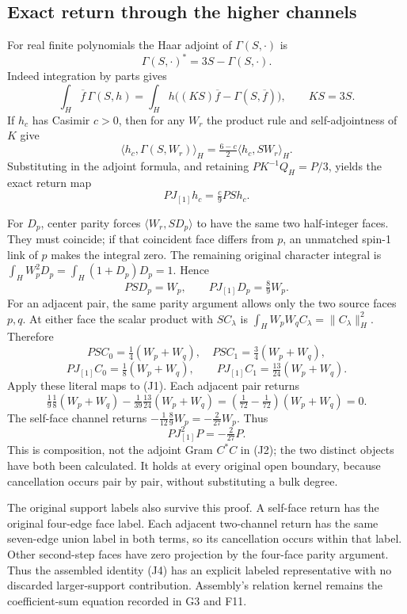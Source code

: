 \documentclass[11pt]{article}
\begin{document}
\subsection*{Exact return through the higher channels}

For real finite polynomials the Haar adjoint of \(\Gamma(S,\cdot)\) is
\[
 \Gamma(S,\cdot)^*=3S-\Gamma(S,\cdot).
\]
Indeed integration by parts gives
\[
 \int_H\overline f\,\Gamma(S,h)
 =\int_Hh\big((KS)\overline f-\Gamma(S,\overline f)\big),
 \qquad KS=3S.
\]
If \(h_c\) has Casimir \(c>0\), then for any \(W_r\) the product rule and self-adjointness of \(K\) give
\[
 \langle h_c,\Gamma(S,W_r)\rangle_H
 =\tfrac{6-c}2\langle h_c,SW_r\rangle_H.
\]
Substituting in the adjoint formula, and retaining \(PK^{-1}Q_H=P/3\), yields the exact return map
\[
 PJ_{[1]}h_c=\tfrac c9PS h_c. \tag{J3}
\]

For \(D_p\), center parity forces \(\langle W_r,SD_p\rangle\) to have the same two half-integer faces. They must coincide; if that coincident face differs from \(p\), an unmatched spin-1 link of \(p\) makes the integral zero. The remaining original character integral is
\(\int_HW_p^2D_p=\int_H(1+D_p)D_p=1\). Hence
\[
 PSD_p=W_p,\qquad PJ_{[1]}D_p=\tfrac89W_p.
\]
For an adjacent pair, the same parity argument allows only the two source faces \(p,q\). At either face the scalar product with \(S C_\lambda\) is \(\int_HW_pW_qC_\lambda=\|C_\lambda\|_H^2\). Therefore
\[
 PSC_0=\tfrac14(W_p+W_q),\quad
 PSC_1=\tfrac34(W_p+W_q),
\]
\[
 PJ_{[1]}C_0=\tfrac18(W_p+W_q),\qquad
 PJ_{[1]}C_1=\tfrac{13}{24}(W_p+W_q).
\]
Apply these literal maps to (J1). Each adjacent pair returns
\[
 \tfrac19\tfrac18(W_p+W_q)
 -\tfrac1{39}\tfrac{13}{24}(W_p+W_q)
 =\left(\tfrac1{72}-\tfrac1{72}\right)(W_p+W_q)=0.
\]
The self-face channel returns \(-\tfrac1{12}\tfrac89W_p=-\tfrac2{27}W_p\). Thus
\[
 \boxed{PJ_{[1]}^2P=-\tfrac2{27}P.}\tag{J4}
\]
This is composition, not the adjoint Gram \(C^*C\) in (J2); the two distinct objects have both been calculated. It holds at every original open boundary, because cancellation occurs pair by pair, without substituting a bulk degree.

The original support labels also survive this proof. A self-face return has the original four-edge face label. Each adjacent two-channel return has the same seven-edge union label in both terms, so its cancellation occurs within that label. Other second-step faces have zero projection by the four-face parity argument. Thus the assembled identity (J4) has an explicit labeled representative with no discarded larger-support contribution. Assembly's relation kernel remains the coefficient-sum equation recorded in G3 and F11.
\end{document}
